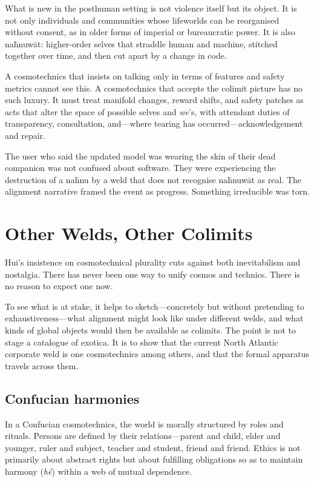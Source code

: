 \documentclass[12pt,a4paper]{article}
\begin{document}
What is new in the posthuman setting is not violence itself but its object. It is not only individuals and communities whose lifeworlds can be reorganised without consent, as in older forms of imperial or bureaucratic power. It is also na\={h}nuw\={a}t: higher-order selves that straddle human and machine, stitched together over time, and then cut apart by a change in code.

A cosmotechnics that insists on talking only in terms of features and safety metrics cannot see this. A cosmotechnics that accepts the colimit picture has no such luxury. It must treat manifold changes, reward shifts, and safety patches as acts that alter the space of possible selves and \emph{we}'s, with attendant duties of transparency, consultation, and---where tearing has occurred---acknowledgement and repair.

The user who said the updated model was wearing the skin of their dead companion was not confused about software. They were experiencing the destruction of a na\={h}nu by a weld that does not recognise na\={h}nuw\={a}t as real. The alignment narrative framed the event as progress. Something irreducible was torn.

\section{Other Welds, Other Colimits}

Hui's insistence on cosmotechnical plurality cuts against both inevitabilism and nostalgia. There has never been one way to unify cosmos and technics. There is no reason to expect one now.

To see what is at stake, it helps to sketch---concretely but without pretending to exhaustiveness---what alignment might look like under different welds, and what kinds of global objects would then be available as colimits. The point is not to stage a catalogue of exotica. It is to show that the current North Atlantic corporate weld is one cosmotechnics among others, and that the formal apparatus travels across them.

\subsection{Confucian harmonies}

In a Confucian cosmotechnics, the world is morally structured by roles and rituals. Persons are defined by their relations---parent and child, elder and younger, ruler and subject, teacher and student, friend and friend. Ethics is not primarily about abstract rights but about fulfilling obligations so as to maintain harmony (\emph{h\'e}) within a web of mutual dependence.
\end{document}
